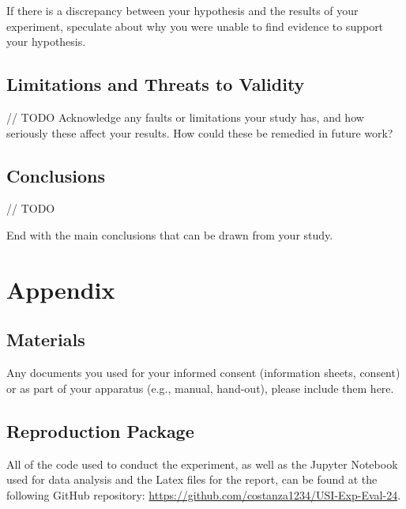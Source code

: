 \documentclass[unicode,11pt,a4paper,oneside,numbers=endperiod,openany]{scrartcl}
\begin{document}
    If there is a discrepancy between your hypothesis and the results of your experiment, speculate about why you were unable to find evidence to support your hypothesis. 


    \subsection{Limitations and Threats to Validity}

    // TODO
    Acknowledge any faults or limitations your study has, and how seriously these affect your results. How could these be remedied in future work?


    \subsection{Conclusions}

    // TODO
    
    End with the main conclusions that can be drawn from your study.

\section{Appendix}

    \subsection{Materials}

    Any documents you used for your informed consent (information sheets, consent) or as part of your apparatus (e.g., manual, hand-out), please include them here.


    \subsection{Reproduction Package}
    All of the code used to conduct the experiment, as well as the Jupyter Notebook used for data analysis and the Latex files for the report, can be found at the following GitHub repository: \url{https://github.com/costanza1234/USI-Exp-Eval-24}.
\end{document}
